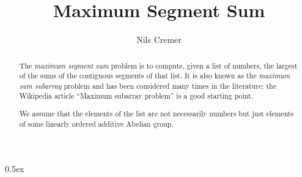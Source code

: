 \documentclass[11pt,a4paper]{article}
\begin{document}
\title{Maximum Segment Sum}
\author{Nils Cremer}
\maketitle

\begin{abstract}
  The \emph{maximum segment sum} problem is to compute, given a list of numbers,
the largest of the sums of the contiguous segments of that list. It is also known
as the \emph{maximum sum subarray} problem and has been considered many times in the literature;
the Wikipedia article ``Maximum subarray problem''\cite{wiki} is a good starting point.

We assume that the elements of the list are not necessarily numbers but just elements
of some linearly ordered additive Abelian group.
\end{abstract}

\tableofcontents

\parindent 0pt\parskip 0.5ex





\end{document}

